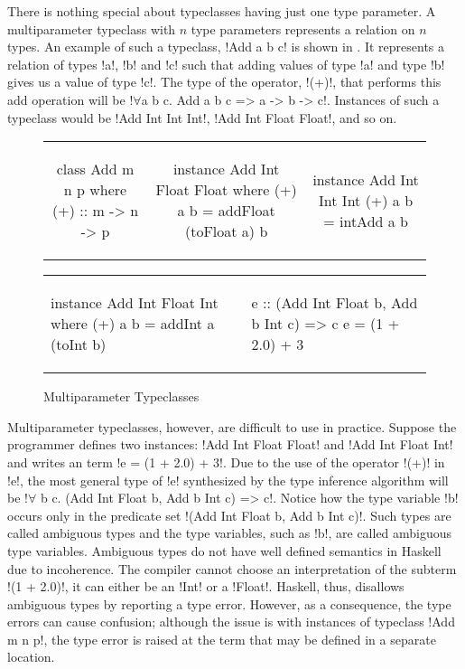 \documentclass[format=acmsmall,manuscript,review,screen,nonacm,margin=1in,11pt]{acmart}
\begin{document}
There is nothing special about typeclasses having just one type parameter. 
A multiparameter typeclass with $n$ type parameters represents a relation on $n$ types.
An example of such a typeclass, !Add a b c! is shown in .
It represents a relation of types !a!, !b! and !c! such that adding values of type !a! and type !b!
gives us a value of type !c!. The type of the operator, !(+)!, that performs this add operation will be
!$\forall$a b c. Add a b c => a -> b -> c!. Instances of such a typeclass would be !Add Int Int Int!,
!Add Int Float Float!, and so on.
\begin{figure}[ht]
  \footnotesize
  \begin{tabular}{c c c}
\begin{code}
class Add m n p where
  (+) :: m -> n -> p
\end{code}&%
\begin{code}
instance Add Int Float Float where
  (+) a b = addFloat (toFloat a) b
\end{code}&%
\begin{code}
instance Add Int Int Int
  (+) a b = intAdd a b
\end{code}
  \end{tabular}
  \begin{tabular}{l l}
\begin{code}
instance Add Int Float Int where
  (+) a b = addInt a (toInt b)
\end{code}&%
\begin{code}
e :: (Add Int Float b, Add b Int c) => c
e = (1 + 2.0) + 3
\end{code}
  \end{tabular}
  \caption{Multiparameter Typeclasses}
  \label{fig:multip-typeclass}
\end{figure}

Multiparameter typeclasses, however, are difficult to use in practice.
Suppose the programmer defines two instances: !Add Int Float Float! and !Add Int Float Int!
and writes an term !e = (1 + 2.0) + 3!.
Due to the use of the operator !(+)! in !e!, the most general type of !e! synthesized
by the type inference algorithm will be !$\forall$ b c. (Add Int Float b, Add b Int c) => c!.
Notice how the type variable !b! occurs only in the predicate set !(Add Int Float b, Add b Int c)!.
Such types are called ambiguous types and the type variables, such as !b!,
are called ambiguous type variables. Ambiguous types do not have well defined semantics in Haskell
due to incoherence. The compiler cannot choose an interpretation of the subterm !(1 + 2.0)!, it can
either be an !Int! or a !Float!. Haskell, thus, disallows ambiguous types by reporting a type error.
However, as a consequence, the type errors can cause confusion; although the issue is with
instances of typeclass !Add m n p!, the type error is raised at the term that may be
defined in a separate location.
\end{document}
